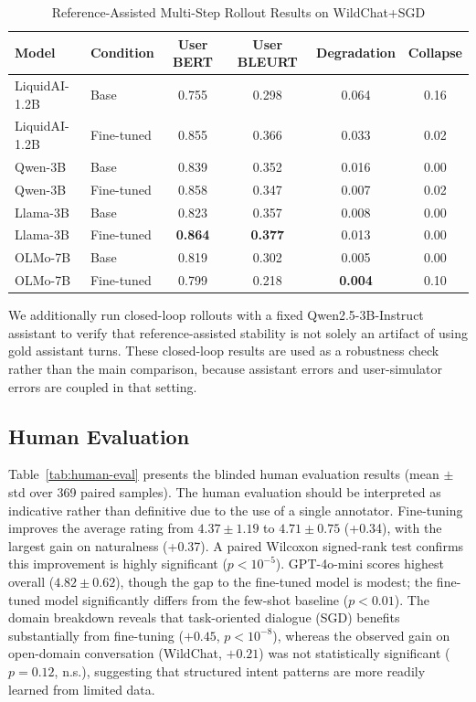 \documentclass[conference]{IEEEtran}
\begin{document}
\begin{table}[ht]
\centering
\footnotesize
\setlength{\tabcolsep}{4pt}
\caption{Reference-Assisted Multi-Step Rollout Results on WildChat+SGD}
\label{tab:rollout-results}
\begin{tabular}{llcccc}
\toprule
\textbf{Model} & \textbf{Condition} & \textbf{User BERT} & \textbf{User BLEURT} & \textbf{Degradation} & \textbf{Collapse} \\
\midrule
LiquidAI-1.2B & Base & 0.755 & 0.298 & 0.064 & 0.16 \\
LiquidAI-1.2B & Fine-tuned & 0.855 & 0.366 & 0.033 & 0.02 \\
Qwen-3B & Base & 0.839 & 0.352 & 0.016 & 0.00 \\
Qwen-3B & Fine-tuned & 0.858 & 0.347 & 0.007 & 0.02 \\
Llama-3B & Base & 0.823 & 0.357 & 0.008 & 0.00 \\
Llama-3B & Fine-tuned & \textbf{0.864} & \textbf{0.377} & 0.013 & 0.00 \\
OLMo-7B & Base & 0.819 & 0.302 & 0.005 & 0.00 \\
OLMo-7B & Fine-tuned & 0.799 & 0.218 & \textbf{0.004} & 0.10 \\
\bottomrule
\end{tabular}
\end{table}

We additionally run closed-loop rollouts with a fixed Qwen2.5-3B-Instruct assistant to verify that reference-assisted stability is not solely an artifact of using gold assistant turns. These closed-loop results are used as a robustness check rather than the main comparison, because assistant errors and user-simulator errors are coupled in that setting.

\subsection{Human Evaluation}

Table~\ref{tab:human-eval} presents the blinded human evaluation results (mean $\pm$ std over 369 paired samples). The human evaluation should be interpreted as indicative rather than definitive due to the use of a single annotator.
Fine-tuning improves the average rating from $4.37 \pm 1.19$ to $4.71 \pm 0.75$ (+0.34), with the largest gain on naturalness (+0.37). A paired Wilcoxon signed-rank test confirms this improvement is highly significant ($p < 10^{-5}$). GPT-4o-mini scores highest overall ($4.82 \pm 0.62$), though the gap to the fine-tuned model is modest; the fine-tuned model significantly differs from the few-shot baseline ($p < 0.01$). The domain breakdown reveals that task-oriented dialogue (SGD) benefits substantially from fine-tuning ($+0.45$, $p < 10^{-8}$), whereas the observed gain on open-domain conversation (WildChat, $+0.21$) was not statistically significant ($p = 0.12$, n.s.), suggesting that structured intent patterns are more readily learned from limited data.
\end{document}
